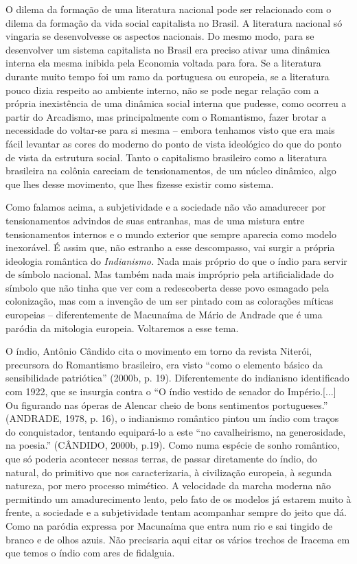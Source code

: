 O dilema da formação de uma literatura nacional pode ser relacionado com
o dilema da formação da vida social capitalista no Brasil. A literatura
nacional só vingaria se desenvolvesse os aspectos nacionais. Do mesmo
modo, para se desenvolver um sistema capitalista no Brasil era preciso
ativar uma dinâmica interna ela mesma inibida pela Economia voltada para
fora. Se a literatura durante muito tempo foi um ramo da portuguesa ou
europeia, se a literatura pouco dizia respeito ao ambiente interno, não
se pode negar relação com a própria inexistência de uma dinâmica social
interna que pudesse, como ocorreu a partir do Arcadismo, mas
principalmente com o Romantismo, fazer brotar a necessidade do voltar-se
para si mesma -- embora tenhamos visto que era mais fácil levantar as
cores do moderno do ponto de vista ideológico do que do ponto de vista
da estrutura social. Tanto o capitalismo brasileiro como a literatura
brasileira na colônia careciam de tensionamentos, de um núcleo dinâmico,
algo que lhes desse movimento, que lhes fizesse existir como sistema.

Como falamos acima, a subjetividade e a sociedade não vão amadurecer por
tensionamentos advindos de suas entranhas, mas de uma mistura entre
tensionamentos internos e o mundo exterior que sempre aparecia como
modelo inexorável. É assim que, não estranho a esse descompasso, vai
surgir a própria ideologia romântica do \emph{Indianismo.} Nada mais
próprio do que o índio para servir de símbolo nacional. Mas também nada
mais impróprio pela artificialidade do símbolo que não tinha que ver com
a redescoberta desse povo esmagado pela colonização, mas com a invenção
de um ser pintado com as colorações míticas europeias -- diferentemente
de Macunaíma de Mário de Andrade que é uma paródia da mitologia
europeia. Voltaremos a esse tema.

O índio, Antônio Cândido cita o movimento em torno da revista Niterói,
precursora do Romantismo brasileiro, era visto ``como o elemento básico
da sensibilidade patriótica'' (2000b, p. 19). Diferentemente do
indianisno identificado com 1922, que se insurgia contra o ``O índio
vestido de senador do Império.{[}...{]} Ou figurando nas óperas de
Alencar cheio de bons sentimentos portugueses.'' (ANDRADE, 1978, p. 16),
o indianismo romântico pintou um índio com traços do conquistador,
tentando equipará-lo a este ``no cavalheirismo, na generosidade, na
poesia.'' (CÂNDIDO, 2000b, p.19). Como numa espécie de sonho romântico,
que só poderia acontecer nessas terras, de passar diretamente do índio,
do natural, do primitivo que nos caracterizaria, à civilização europeia,
à segunda natureza, por mero processo mimético. A velocidade da marcha
moderna não permitindo um amadurecimento lento, pelo fato de os modelos
já estarem muito à frente, a sociedade e a subjetividade tentam
acompanhar sempre do jeito que dá. Como na paródia expressa por
Macunaíma que entra num rio e sai tingido de branco e de olhos azuis.
Não precisaria aqui citar os vários trechos de Iracema em que temos o
índio com ares de fidalguia.

